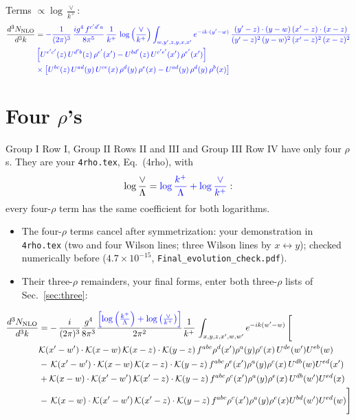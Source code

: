 \documentclass[10pt]{article}
\numberwithin{equation}{section}
\newcommand{\new}[1]{{\color{blue}#1}}
\newcommand{\nc}{\color{blue}}
\begin{document}
\noindent Terms $\propto\log\frac{\vee}{k^+}$:
\begin{align}
    \frac{d^{3}N_{\rm NLO}}{d^{3}k} & =  \nc -\frac{1}{(2\pi)^{3}}\, \frac{ig^{4}\,f^{c'd'a}}{8\pi^{5}}\, \frac{1}{k^{+}}\,\log{\left(\frac{\vee}{k^{+}}\right)}\int_{w,y',z,y,x,x'} e^{-ik\cdot (y'-w)}\,\frac{(y'-z)\cdot (y-w)\,(x'-z)\cdot (x-z)}{(y'-z)^{2}\,(y-w)^{2}\,(x'-z)^{2}\,(x-z)^{2}}\notag \\
& \nc  \left[U^{e'c'}(z)\,U^{d'b}(z)\,\rho^{e'}(x')-U^{bd'}(z)\,U^{c'e'}(x')\,\rho^{e'}(x')\right]\notag \\
& \nc  \times\left[U^{bc}(z)\,U^{ad}(y)\,U^{ce}(x)\,\rho^{d}(y)\,\rho^{e}(x)-U^{ad}(y)\,\rho^{d}(y)\,\rho^{b}(x)\right] \label{eq:B:G3VI}
\end{align}


\section{Four \texorpdfstring{$\rho$}{rho}'s}\label{sec:four}
Group I Row I, Group II Rows II and III and Group III Row IV have only four $\rho$\textquotesingle s. They are your \texttt{4rho.tex}, Eq.~(4rho), with
\begin{equation*}
\log\frac{\vee}{\Lambda}=\new{\log\frac{k^+}{\Lambda}+\log\frac{\vee}{k^+}}:
\end{equation*}
every four-$\rho$ term has the same coefficient for both logarithms.
\begin{itemize}
\item The four-$\rho$ terms cancel after symmetrization: your demonstration in \texttt{4rho.tex} (two and four Wilson lines; three Wilson lines by $x\leftrightarrow y$); checked numerically before ($4.7\times10^{-15}$, \texttt{Final\_evolution\_check.pdf}).
\item Their three-$\rho$ remainders, your final forms, enter both three-$\rho$ lists of Sec.~\ref{sec:three}:
\end{itemize}
\begin{align}
    \frac{d^{3}N_{\rm NLO}}{d^{3}k} & = -\,\frac{i}{(2\pi)^{3}}\frac{g^{4}}{8\pi^{3}}\frac{\new{\left[\log{\left(\frac{k^{+}}{\Lambda}\right)}+\log{\left(\frac{\vee}{k^{+}}\right)}\right]}}{2\pi^{2}} \frac{1}{k^{+}}\,\int_{x,y,z,x^{\prime},w,w^{\prime}}e^{-ik(w^{\prime}-w)}\, \Bigg[\notag \\ &  \mathcal{K}(x'-w')\cdot \mathcal{K}(x-w)\, \mathcal{K}(x-z)\cdot \mathcal{K}(y-z)\, f^{a b c} \rho^{d}(x') \rho^{a}(y) \rho^{c}(x)\,U^{d e}(w') U^{e b}(w) \nonumber\\
    &  -\,\mathcal{K}(x'-w')\cdot \mathcal{K}(x-w)\, \mathcal{K}(x-z)\cdot \mathcal{K}(y-z)\, f^{a b c} \rho^{e}(x') \rho^{a}(y) \rho^{c}(x)\, U^{d b}(w) U^{e d}(x')\nonumber\\
    & + \mathcal{K}(x-w)\cdot \mathcal{K}(x'-w')\, \mathcal{K}(x'-z)\cdot \mathcal{K}(y-z)\, f^{a b c} \rho^{c}(x') \rho^{a}(y) \rho^{e}(x)\,U^{d b}(w') U^{e d}(x) \nonumber\\
    & -\,\mathcal{K}(x-w)\cdot \mathcal{K}(x'-w')\, \mathcal{K}(x'-z)\cdot \mathcal{K}(y-z)\, f^{a b c} \rho^{c}(x') \rho^{a}(y) \rho^{e}(x) U^{b d}(w') U^{e d}(w)\Bigg]
\label{eq:foura}
\end{align}
\end{document}
